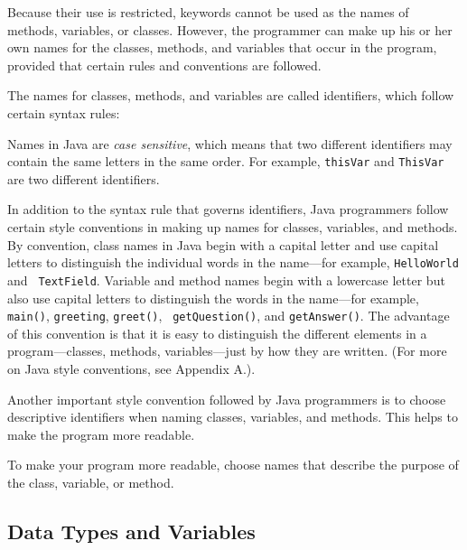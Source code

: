 Because their use is restricted, keywords cannot be used as the names
of methods, variables, or classes.  However, the programmer can make
up his or her own names for the classes, methods, and variables that
occur in the program, provided that certain rules and conventions are
followed.

The names for classes, methods, and variables are called identifiers,
which follow certain syntax rules:


\noindent Names in Java are {\it case sensitive}, which means that
two different identifiers may contain the same letters in the same
order. For example, {\tt thisVar} and {\tt ThisVar} are two different
identifiers.

In addition to the syntax rule that governs identifiers, Java
programmers follow certain style conventions in making up names for
classes, variables, and methods. By convention, class names in Java
begin with a capital letter and use capital letters to distinguish the
individual words in the name---for example, {\tt HelloWorld} and {\tt
{}
TextField}.  Variable and method names begin with a lowercase letter
but also use capital letters to distinguish the words in the
name---for example, {\tt main()}, {\tt greeting}, {\tt greet()}, {\tt
getQuestion()}, and {\tt getAnswer()}.  The advantage of this convention
is that it is easy to distinguish the different elements in a
program---classes, methods, variables---just by how they are
written. (For more on Java style conventions, see
Appendix A.).

Another important style convention followed by Java programmers
is to choose descriptive identifiers when naming classes,
variables, and methods. This helps to make the program more
readable.

%
{To make your program more readable, choose names that describe the
purpose of the class, variable, or method.}

\subsection{Data Types and Variables}
\label{sec-primitives}
\label{pg-sec-primitives}

